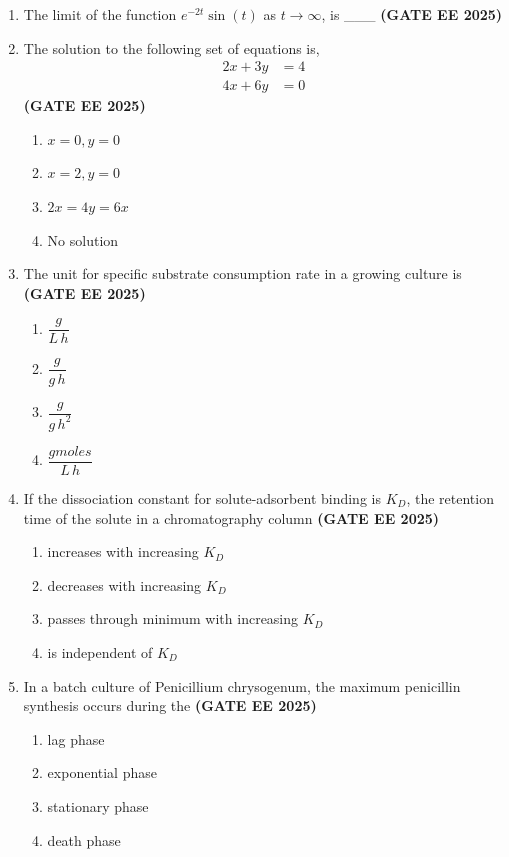 \documentclass[journal,12pt,onecolumn]{IEEEtran}
\theoremstyle{remark}
\begin{document}
\begin{enumerate}
\item The limit of the function $e^{-2t}\sin(t)$ as $t \to \infty$, is \_\_\_
\hfill \textbf{(GATE EE 2025)}
\item  The solution to the following set of equations is,
\[
\begin{aligned}
2x + 3y &= 4 \\
4x + 6y &= 0
\end{aligned}
\] \hfill \textbf{(GATE EE 2025)}
\begin{enumerate}
\item  $x=0, y=0$
\item  $x=2, y=0$
\item  $2x = 4y = 6x$
\item  No solution
\end{enumerate}

\item The unit for specific substrate consumption rate in a growing culture is \hfill \textbf{(GATE EE 2025)}
\begin{enumerate}
\item  $\dfrac{g}{L \, h}$
\item  $\dfrac{g}{g \, h}$
\item  $\dfrac{g}{g \, h^2}$
\item  $\dfrac{gmoles}{L \, h}$
\end{enumerate}

\item If the dissociation constant for solute-adsorbent binding is $K_D$, the retention time of the solute in a chromatography column \hfill \textbf{(GATE EE 2025)}
\begin{enumerate}
\item  increases with increasing $K_D$
\item  decreases with increasing $K_D$
\item  passes through minimum with increasing $K_D$
\item  is independent of $K_D$
\end{enumerate}

\item In a batch culture of  Penicillium chrysogenum, the maximum penicillin synthesis occurs during the \hfill \textbf{(GATE EE 2025)}
\begin{enumerate}
\item  lag phase
\item  exponential phase
\item  stationary phase
\item  death phase
\end{enumerate}


\end{enumerate}
\end{document}
